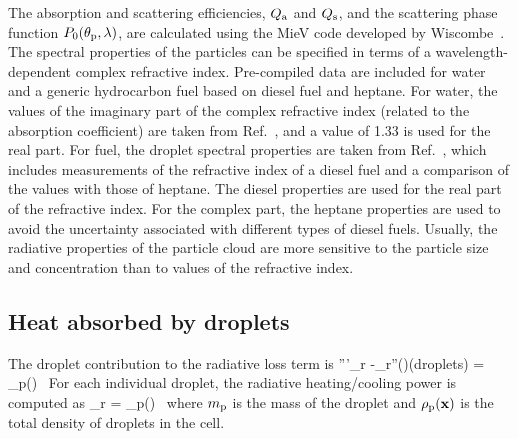 The absorption and scattering efficiencies, $Q_{\rm a}$ and $Q_{\rm s}$, and the scattering phase function $P_0(\theta_{\rm p},\lambda)$, are calculated using the MieV code developed by Wiscombe~\cite{Wiscombe}. The spectral properties of the particles can be specified in terms of a wavelength-dependent complex refractive index. Pre-compiled data are included for water and a generic hydrocarbon fuel based on diesel fuel and heptane. For water, the values of the imaginary part of the complex refractive index (related to the absorption coefficient) are taken from Ref.~\cite{Hale:1}, and a value of 1.33 is used for the real part. For fuel, the droplet spectral properties are taken from Ref.~\cite{Dombrovsky:1}, which includes measurements of the refractive index of a diesel fuel and a comparison of the values with those of heptane. The diesel properties are used for the real part of the refractive index. For the complex part, the heptane properties are used to avoid the uncertainty associated with different types of diesel fuels. Usually, the radiative properties of the particle cloud are more sensitive to the particle size and concentration than to values of the refractive index.



\subsection{Heat absorbed by droplets}

The droplet contribution to the radiative loss term is
\be {}'''_{\rm r} \equiv -\nabla\!\cdot \dbq_{\rm r}''(\bx)(\mbox{droplets}) =
    \kappa_{\rm p}(\bx) \, \left[ U(\bx) - 4 \pi \, I_{{\rm b,p}}(\bx) \right]
\ee
For each individual droplet, the radiative heating/cooling power is computed as
\be
\dq_{\rm r} = 
    \kappa_{\rm p}(\bx) \, \left[ U(\bx) - 4\pi \, I_{{\rm b,p}}(\bx) \right]
\ee
where $m_{\rm p}$ is the mass of the droplet and $\rho_{\rm p}({\mathbf{x}})$ is the total density of droplets in the cell.





